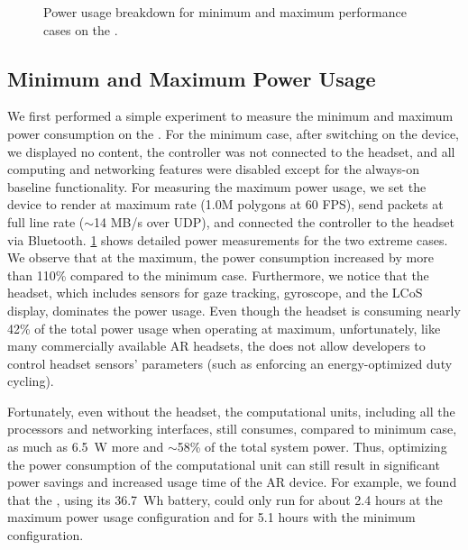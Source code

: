 \begin{figure}[t]
    \centering
    \vspace{-1ex}
    \hfill
    \vspace{-2ex}
    \caption{Power usage breakdown for minimum and maximum performance cases on the \mlo.}
    \label{fig:minmax-energy}
\end{figure}






\subsection{Minimum and Maximum Power Usage}

We first performed a simple experiment to measure the minimum and maximum power consumption on the \mlo. For the minimum case, after switching on the device, we displayed no content, the controller was not connected to the headset, and all computing and networking features were disabled except for the always-on baseline functionality. For measuring the maximum power usage, we set the device to render at maximum rate (1.0M polygons at 60 FPS), send packets at full line rate ($\sim$14 MB/s over UDP), and connected the controller to the headset via Bluetooth. \fig\ref{fig:minmax-energy} shows detailed power measurements for the two extreme cases. We observe that at the maximum, the power consumption increased by more than 110\% compared to the minimum case.
%
Furthermore, we notice that the headset, which includes sensors for gaze tracking, gyroscope, and the LCoS display, dominates the power usage. %
Even though the headset is consuming nearly 42\% of the total power usage when operating at maximum, unfortunately, like many commercially available AR headsets, the {\mlo} does not allow developers to control headset sensors' parameters (such as enforcing an energy-optimized duty cycling).

Fortunately, even without the headset, the computational units, including all the processors and networking interfaces, still consumes, compared to minimum case, as much as 6.5~W more and $\sim$58\% of the total system power. Thus, optimizing the power consumption of the computational unit can still result in significant power savings and increased usage time of the AR device. For example, we found that the {\mlo}, using its 36.7~Wh battery, could only run for about 2.4 hours at the maximum power usage configuration and for 5.1 hours with the minimum configuration.


